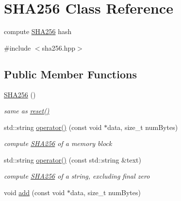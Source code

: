 \hypertarget{classSHA256}{\section{S\-H\-A256 Class Reference}
\label{classSHA256}
}


compute \hyperlink{classSHA256}{S\-H\-A256} hash  




{\ttfamily \#include $<$sha256.\-hpp$>$}

\subsection*{Public Member Functions}
\begin{DoxyCompactItemize}
\item 
\hypertarget{classSHA256_ab672831c542df07ff03ded25760feec2}{\hyperlink{classSHA256_ab672831c542df07ff03ded25760feec2}{S\-H\-A256} ()}\label{classSHA256_ab672831c542df07ff03ded25760feec2}

\begin{DoxyCompactList}\small\item\em same as \hyperlink{classSHA256_ad9d80d8fdccffb15497bd36285afce65}{reset()} \end{DoxyCompactList}\item 
\hypertarget{classSHA256_a8e89aa2cb5506eb54c43f4397ca3a5d2}{std\-::string \hyperlink{classSHA256_a8e89aa2cb5506eb54c43f4397ca3a5d2}{operator()} (const void $\ast$data, size\-\_\-t num\-Bytes)}\label{classSHA256_a8e89aa2cb5506eb54c43f4397ca3a5d2}

\begin{DoxyCompactList}\small\item\em compute \hyperlink{classSHA256}{S\-H\-A256} of a memory block \end{DoxyCompactList}\item 
\hypertarget{classSHA256_adb084fa7b3133b9a6da752d4c83c878c}{std\-::string \hyperlink{classSHA256_adb084fa7b3133b9a6da752d4c83c878c}{operator()} (const std\-::string \&text)}\label{classSHA256_adb084fa7b3133b9a6da752d4c83c878c}

\begin{DoxyCompactList}\small\item\em compute \hyperlink{classSHA256}{S\-H\-A256} of a string, excluding final zero \end{DoxyCompactList}\item 
\hypertarget{classSHA256_a23602bf69c7e52161d7ef5d5fdc7d1da}{void \hyperlink{classSHA256_a23602bf69c7e52161d7ef5d5fdc7d1da}{add} (const void $\ast$data, size\-\_\-t num\-Bytes)}\label{classSHA256_a23602bf69c7e52161d7ef5d5fdc7d1da}


\end{DoxyCompactItemize}
